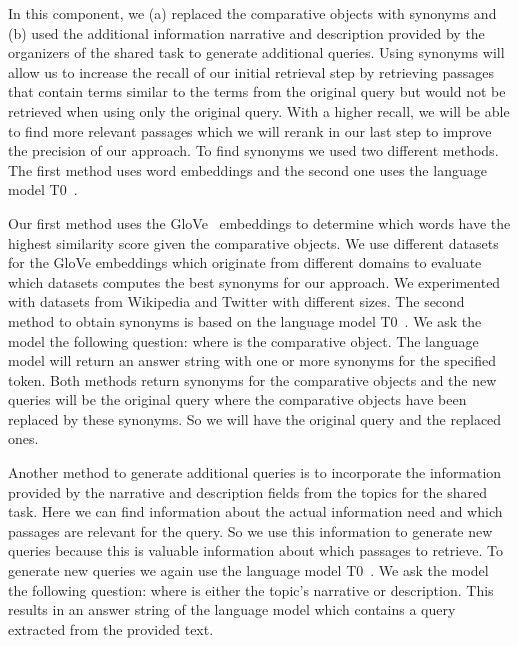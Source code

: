 In this component, we (a) replaced the comparative objects with synonyms and (b) used the additional information narrative and description provided by the organizers of the shared task to generate additional queries.
Using synonyms will allow us to increase the recall of our initial retrieval step by retrieving passages that contain terms similar to the terms from the original query but would not be retrieved when using only the original query.
With a higher recall, we will be able to find more relevant passages which we will rerank in our last step to improve the precision of our approach.
To find synonyms we used two different methods.
The first method uses word embeddings and the second one uses the language model T0~\cite{SanhWRBSACSLRDBXTSSKCNDCJWMSYPBWNRSSFFTBGBWR2021}.

Our first method uses the GloVe~\cite{PenningtonSM2014} embeddings to determine which words have the highest similarity score given the comparative objects.
We use different datasets for the GloVe embeddings which originate from different domains to evaluate which datasets computes the best synonyms for our approach.
We experimented with datasets from Wikipedia and Twitter with different sizes.
The second method to obtain synonyms is based on the language model T0~\cite{SanhWRBSACSLRDBXTSSKCNDCJWMSYPBWNRSSFFTBGBWR2021}.
We ask the model the following question:  where  is the comparative object.
The language model will return an answer string with one or more synonyms for the specified token.
Both methods return synonyms for the comparative objects and the new queries will be the original query where the comparative objects have been replaced by these synonyms.
So we will have the original query and the replaced ones.

Another method to generate additional queries is to incorporate the information provided by the narrative and description fields from the topics for the shared task.
Here we can find information about the actual information need and which passages are relevant for the query. So we use this information to generate new queries because this is valuable information about which passages to retrieve.
To generate new queries we again use the language model T0~\cite{SanhWRBSACSLRDBXTSSKCNDCJWMSYPBWNRSSFFTBGBWR2021}.
We ask the model the following question:  where  is either the topic's narrative or description.
This results in an answer string of the language model which contains a query extracted from the provided text. 

